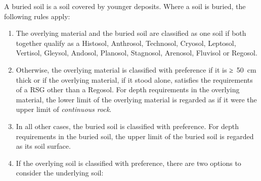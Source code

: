 \documentclass[
  letterpaper,
  DIV=11,
  numbers=noendperiod]{scrreprt}
\providecommand{\tightlist}{%
  \setlength{\itemsep}{0pt}\setlength{\parskip}{0pt}}\usepackage{longtable,booktabs,array}
\begin{document}
A buried soil is a soil covered by younger deposits. Where a soil is
buried, the following rules apply:

\begin{enumerate}
\def\labelenumi{\arabic{enumi}.}
\tightlist
\item
  The overlying material and the buried soil are classified as one soil
  if both together qualify as a Histosol, Anthrosol, Technosol, Cryosol,
  Leptosol, Vertisol, Gleysol, Andosol, Planosol, Stagnosol, Arenosol,
  Fluvisol or Regosol.
\item
  Otherwise, the overlying material is classified with preference if it
  is ≥~50~cm thick or if the overlying material, if it stood alone,
  satisfies the requirements of a RSG other than a Regosol. For depth
  requirements in the overlying material, the lower limit of the
  overlying material is regarded as if it were the upper limit of
  \emph{continuous rock}.
\item
  In all other cases, the buried soil is classified with preference. For
  depth requirements in the buried soil, the upper limit of the buried
  soil is regarded as its soil surface.
\item
  If the overlying soil is classified with preference, there are two
  options to consider the underlying soil:


\end{enumerate}
\end{document}
